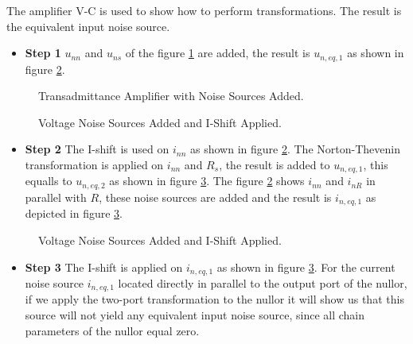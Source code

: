 \documentclass[letterpaper]{ecctd01}
\begin{document}
The amplifier V-C is used to show how to perform transformations. The result is the equivalent input noise source.

\begin{itemize}
\item {\bf Step 1} $u_{nn}$ and $u_{ns}$ of the figure \ref{trans1} are added, the result is $u_{n,eq,1}$ as shown in figure \ref{trans2}.
\end{itemize}

\begin{figure}[hbtp]
\centerline{
\epsfxsize=50mm
}
\caption{Transadmittance Amplifier with Noise Sources Added.}
\label{trans1}
\end{figure} 

\begin{figure}[hbtp]
\centerline{
\epsfxsize=50mm
}
\caption{Voltage Noise Sources Added and I-Shift Applied.}
\label{trans2}
\end{figure} 

\begin{itemize}
\item {\bf Step 2} The I-shift is used on $i_{nn}$ as shown in figure \ref{trans2}. The Norton-Thevenin transformation is applied on $i_{nn}$ and $R_s$, the result is added to $u_{n,eq,1}$, this equalls to $u_{n,eq,2}$ as shown in figure \ref{trans3}. The figure \ref{trans2} shows $i_{nn}$ and $i_{nR}$ in parallel with $R$, these noise sources are added and the result is $i_{n,eq,1}$ as depicted in figure \ref{trans3}.
\end{itemize}

\begin{figure}[hbtp]
\centerline{
\epsfxsize=50mm
}
\caption{Voltage Noise Sources Added and I-Shift Applied.}
\label{trans3}
\end{figure} 

\begin{itemize}
\item {\bf Step 3} The I-shift is applied on $i_{n,eq,1}$ as shown in figure \ref{trans3}. For the current noise source $i_{n,eq,1}$ located directly in parallel to the output port of the nullor, if we apply the two-port transformation to the nullor it will show us that this source will not yield any equivalent input noise source, since all chain parameters of the nullor equal zero.
\end{itemize}
\end{document}
